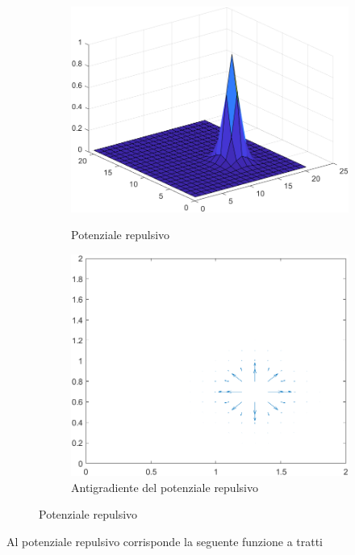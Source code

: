 \documentclass[14pt,a4paper]{extarticle}
\begin{document}
\begin{description}
\begin{figure}[H]
\begin{subfigure}[t]{0.5\textwidth}
\caption{Potenziale repulsivo}
\includegraphics[width=\textwidth]{potR.png}
\label{potR}
\end{subfigure}
\hfill
\begin{subfigure}[t]{0.5\textwidth}
\caption{Antigradiente del potenziale repulsivo}
\label{antigradR}
\includegraphics[width=\textwidth]{antigradR.png}
\end{subfigure}
\caption{Potenziale repulsivo}
\end{figure}

Al potenziale repulsivo corrisponde la seguente funzione a tratti 


\end{description}
\end{document}
